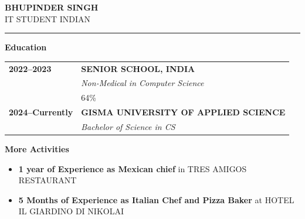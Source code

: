 \documentclass[a4paper,10pt]{article}
\begin{document}
\begin{minipage}[t]{0.6\textwidth}
    \vspace{0.5cm}
    \raggedright
    {\Huge\bfseries BHUPINDER SINGH}\\[0.5cm]
    {\large IT STUDENT \hfill INDIAN}\\[0.2cm]
    {\color{primary}\rule{\linewidth}{1.5pt}}
    \vspace{1.5cm}

    {\color{primary}\Huge\faGraduationCap\hspace{0.2cm}\LARGE\bfseries Education}\\[0.5cm]
    \begin{tabularx}{\linewidth}{@{}l X@{}}
        \textbf{2022--2023} & \textbf{SENIOR SCHOOL, INDIA} \\
        & \textit{Non-Medical in Computer Science} \\
        & 64\% \\[0.8cm]
        \textbf{2024--Currently} & \textbf{GISMA UNIVERSITY OF APPLIED SCIENCE} \\
        & \textit{Bachelor of Science in CS} \\
    \end{tabularx}
    \vspace{2cm}
    
    {\color{primary}\Huge\faChartLine\hspace{0.2cm}\LARGE\bfseries More Activities}\\[0.5cm]
    \begin{itemize}[leftmargin=1.5em, itemsep=10pt, topsep=0pt, label={}]
        \item \textbf{1 year of Experience as Mexican chief} in TRES AMIGOS RESTAURANT
        \item \textbf{5 Months of Experience as Italian Chef and Pizza Baker} at HOTEL IL GIARDINO DI NIKOLAI
    \end{itemize}
\end{minipage}
\end{document}
